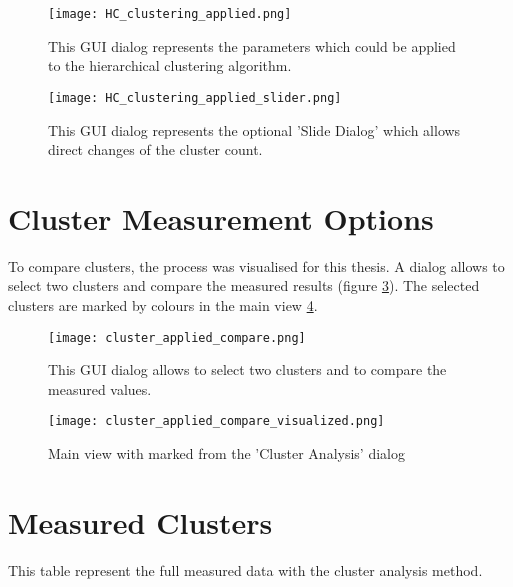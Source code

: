 \begin{figure}[ht]
    \centering
    \texttt{[image: HC\_clustering\_applied.png]}
    \caption{This \gls{GUI} dialog represents the parameters which could be applied to the hierarchical clustering algorithm.}
    \label{fig:applied_HC_clustering_GUI}
\end{figure}

\begin{figure}[ht]
    \centering
    \texttt{[image: HC\_clustering\_applied\_slider.png]}
    \caption{This \gls{GUI} dialog represents the optional 'Slide Dialog' which allows direct changes of the cluster count.}
    \label{fig:applied_HC_clustering_slider_GUI}
\end{figure}

\pagebreak
\section{Cluster Measurement Options} \label{sec:cluster_measurement_options}
To compare clusters, the process was visualised for this thesis. A dialog allows to select two clusters and compare the measured results (figure \ref{fig:applied_clustering_analysis_GUI}). The selected clusters are marked by colours in the main view \ref{fig:applied_clustering_analysis_visualized_GUI}.

\begin{figure}[ht]
    \centering
    \texttt{[image: cluster\_applied\_compare.png]}
    \caption{This \gls{GUI} dialog allows to select two clusters and to compare the measured values.}
    \label{fig:applied_clustering_analysis_GUI}
\end{figure}

\begin{figure}[ht]
    \centering
    \begin{mdframed}[style=border]
        \texttt{[image: cluster\_applied\_compare\_visualized.png]}
    \end{mdframed}
    \caption{Main view with marked from the 'Cluster Analysis' dialog}
    \label{fig:applied_clustering_analysis_visualized_GUI}
\end{figure}

\FloatBarrier
\section{Measured Clusters} \label{sec:measurements_full_table}
This table represent the full measured data with the cluster analysis method.

